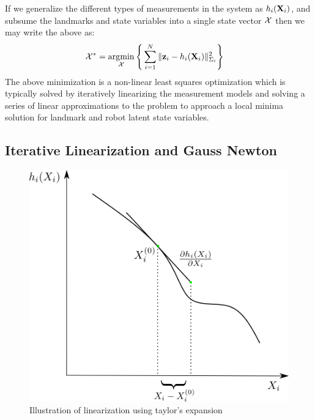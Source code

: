 If we generalize the different types of measurements in the system as $h_i(\mathbf{X}_i)$, and subsume the landmarks and state variables into a single state vector $\mathcal{X}$ then we may write the above as:
\begin{align}
    \mathcal{X}^* = \operatorname*{\arg\!\min}_{\mathcal{X}} \Bigg \{ &\sum_{i=1}^{N} \| \mathbf{z}_i - h_i(\mathbf{X}_i) \|_{\Sigma_i}^2 \Bigg \} \label{eq:2.3}
\end{align}
The above minimization is a non-linear least squares optimization which is typically solved by iteratively linearizing the measurement models and solving a series of linear approximations to the problem to approach a local minima solution for landmark and robot latent state variables.

\subsection{Iterative Linearization and Gauss Newton}

\begin{figure}[htpb]
    \centering
    \includegraphics[width=0.4\linewidth]{figs/linearization}
    \caption{Illustration of linearization using taylor's expansion}
    \label{fig:taylor}
\end{figure}

